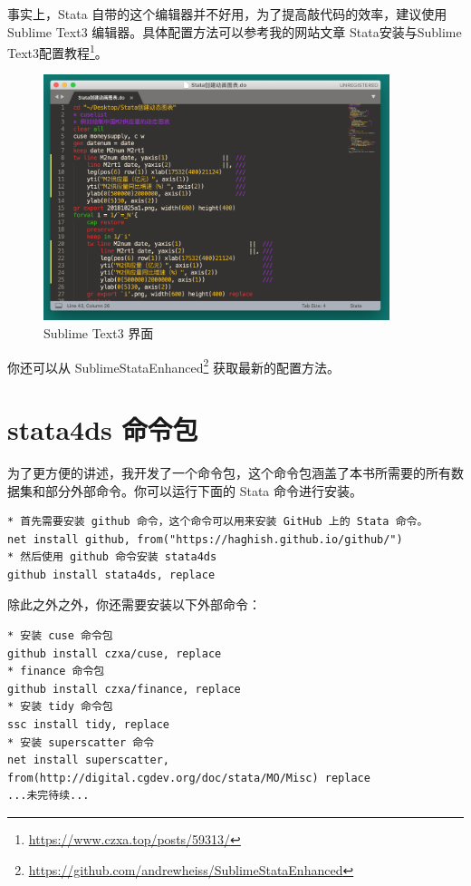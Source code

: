 \documentclass[]{ctexbook}
\renewcommand{\href}[2]{#2\footnote{\url{#1}}}
\begin{document}
事实上，Stata 自带的这个编辑器并不好用，为了提高敲代码的效率，建议使用 Sublime Text3 编辑器。具体配置方法可以参考我的网站文章 \href{https://www.czxa.top/posts/59313/}{Stata安装与Sublime Text3配置教程}。

\begin{figure}

{\centering \includegraphics[width=0.9\textwidth]{assets/sublime} 

}

\caption{Sublime Text3 界面}\label{fig:sublime}
\end{figure}

你还可以从 \href{https://github.com/andrewheiss/SublimeStataEnhanced}{SublimeStataEnhanced} 获取最新的配置方法。

\hypertarget{stata4ds-}{%
\section{stata4ds 命令包}\label{stata4ds-}}

为了更方便的讲述，我开发了一个命令包，这个命令包涵盖了本书所需要的所有数据集和部分外部命令。你可以运行下面的 Stata 命令进行安装。

\begin{lstlisting}
* 首先需要安装 github 命令，这个命令可以用来安装 GitHub 上的 Stata 命令。
net install github, from("https://haghish.github.io/github/")
* 然后使用 github 命令安装 stata4ds
github install stata4ds, replace
\end{lstlisting}

除此之外之外，你还需要安装以下外部命令：

\begin{lstlisting}
* 安装 cuse 命令包
github install czxa/cuse, replace
* finance 命令包
github install czxa/finance, replace
* 安装 tidy 命令包
ssc install tidy, replace
* 安装 superscatter 命令
net install superscatter, from(http://digital.cgdev.org/doc/stata/MO/Misc) replace
...未完待续...
\end{lstlisting}
\end{document}
